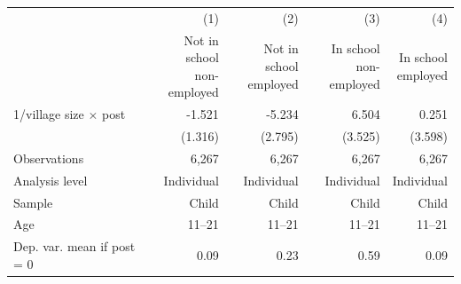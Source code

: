 \begin{center} \begin{threeparttable} \begin{tabular}{l*{4}{r}} \hline \hline 
                    &         (1)&         (2)&         (3)&         (4)\\
                    &\shortstack{Not in school\\non-employed}&\shortstack{Not in school\\employed}&\shortstack{In school\\non-employed}&\shortstack{In school\\employed}\\
\hline
1/village size $\times$ post&      -1.521&      -5.234&       6.504&       0.251\\
                    &     (1.316)&     (2.795)&     (3.525)&     (3.598)\\
\hline
Observations        &       6,267&       6,267&       6,267&       6,267\\
Analysis level      &  Individual&  Individual&  Individual&  Individual\\
Sample              &       Child&       Child&       Child&       Child\\
Age                 &      11--21&      11--21&      11--21&      11--21\\
Dep. var. mean if post = 0&        0.09&        0.23&        0.59&        0.09\\
\hline \end{tabular} \end{threeparttable} \end{center}
